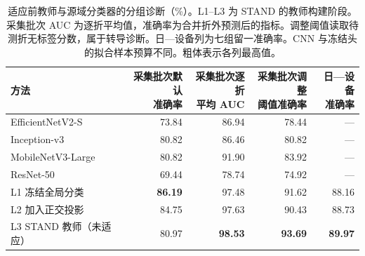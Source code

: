 \begin{table}[htbp]
\centering\small
\caption{适应前教师与源域分类器的分组诊断（\%）。L1--L3 为 STAND 的教师构建阶段。采集批次 AUC 为逐折平均值，准确率为合并折外预测后的指标。调整阈值读取待测折无标签分数，属于转导诊断。日—设备列为七组留一准确率。CNN 与冻结头的拟合样本预算不同。粗体表示各列最高值。}
\label{tab:session}
\begin{adjustbox}{max width=\linewidth}
\begin{tabular}{lrrrr}
\toprule
方法 & \makecell{采集批次默认\\准确率} & \makecell{采集批次逐折\\平均 AUC} & \makecell{采集批次调整\\阈值准确率} & \makecell{日—设备\\准确率}\\
\midrule
EfficientNetV2-S\cite{tan2021} & 73.84 & 86.94 & 78.44 & ---\\
Inception-v3\cite{szegedy2016} & 80.82 & 86.46 & 80.82 & ---\\
MobileNetV3-Large\cite{howard2019} & 80.82 & 91.90 & 83.92 & ---\\
ResNet-50\cite{he2016} & 69.44 & 78.74 & 74.92 & ---\\
L1 冻结全局分类 & \textbf{86.19} & 97.48 & 91.62 & 88.16\\
L2 加入正交投影 & 84.75 & 97.63 & 90.43 & 88.73\\
L3 STAND 教师（未适应） & 80.97 & \textbf{98.53} & \textbf{93.69} & \textbf{89.97}\\
\bottomrule
\end{tabular}
\end{adjustbox}
\end{table}

